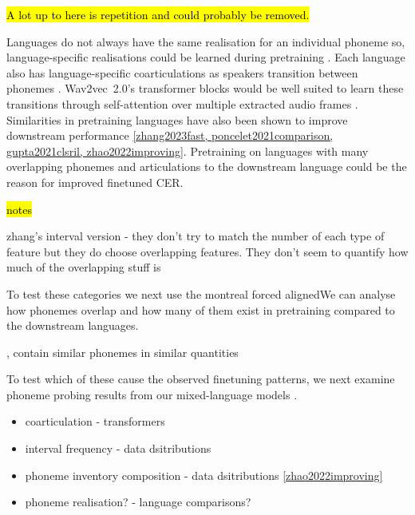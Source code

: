 \hl{A lot up to here is repetition and could probably be removed.}

Languages do not always have the same realisation for an individual phoneme so, language-specific realisations could be learned during pretraining \cite{international1999handbook}. Each language also has language-specific coarticulations as speakers transition between phonemes \cite{international1999handbook}. Wav2vec~2.0's transformer blocks would be well suited to learn these transitions through self-attention over multiple extracted audio frames \cite{vaswani2017attention}. Similarities in pretraining languages have also been shown to improve downstream performance \ref{zhang2023fast, poncelet2021comparison, gupta2021clsril, zhao2022improving}. Pretraining on languages with many overlapping phonemes and articulations to the downstream language could be the reason for improved finetuned CER.  

\hl{notes}

zhang's interval version -  they don't try to match the number of each type of feature but they do choose overlapping features. They don't seem to quantify how much of the overlapping stuff is 

To test these categories we next use the montreal forced alignedWe can analyse how phonemes overlap and how many of them exist in pretraining compared to the downstream languages.  

, contain similar phonemes in similar quantities

To test which of these cause the observed finetuning patterns, we next examine phoneme probing results from our mixed-language models \cite{english2022domain}.


\begin{itemize}
    \item coarticulation - transformers
    \item interval frequency - data dsitributions
    \item phoneme inventory composition - data dsitributions \ref{zhao2022improving}
    \item phoneme realisation? - language comparisons?
\end{itemize}




